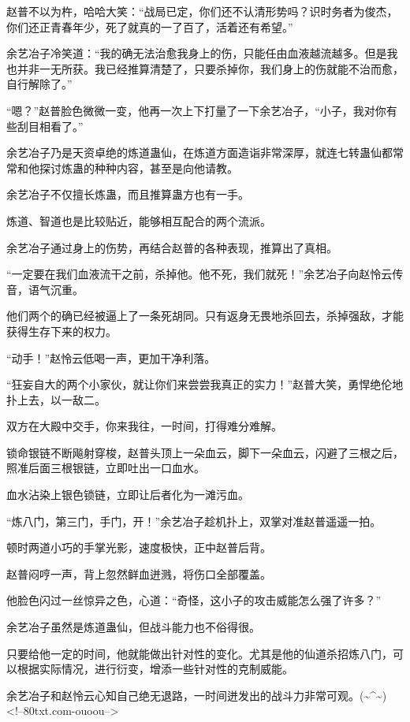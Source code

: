 \begin{this_body}
赵普不以为杵，哈哈大笑：“战局已定，你们还不认清形势吗？识时务者为俊杰，你们还正青春年少，死了就真的一了百了，活着还有希望。”

余艺冶子冷笑道：“我的确无法治愈我身上的伤，只能任由血液越流越多。但是我也并非一无所获。我已经推算清楚了，只要杀掉你，我们身上的伤就能不治而愈，自行解除了。”

“嗯？”赵普脸色微微一变，他再一次上下打量了一下余艺冶子，“小子，我对你有些刮目相看了。”

余艺冶子乃是天资卓绝的炼道蛊仙，在炼道方面造诣非常深厚，就连七转蛊仙都常常和他探讨炼蛊的种种内容，甚至是向他请教。

余艺冶子不仅擅长炼蛊，而且推算蛊方也有一手。

炼道、智道也是比较贴近，能够相互配合的两个流派。

余艺冶子通过身上的伤势，再结合赵普的各种表现，推算出了真相。

“一定要在我们血液流干之前，杀掉他。他不死，我们就死！”余艺冶子向赵怜云传音，语气沉重。

他们两个的确已经被逼上了一条死胡同。只有返身无畏地杀回去，杀掉强敌，才能获得生存下来的权力。

“动手！”赵怜云低喝一声，更加干净利落。

“狂妄自大的两个小家伙，就让你们来尝尝我真正的实力！”赵普大笑，勇悍绝伦地扑上去，以一敌二。

双方在大殿中交手，你来我往，一时间，打得难分难解。

锁命银链不断飚射穿梭，赵普头顶上一朵血云，脚下一朵血云，闪避了三根之后，照准后面三根银链，立即吐出一口血水。

血水沾染上银色锁链，立即让后者化为一滩污血。

“炼八门，第三门，手门，开！”余艺冶子趁机扑上，双掌对准赵普遥遥一拍。

顿时两道小巧的手掌光影，速度极快，正中赵普后背。

赵普闷哼一声，背上忽然鲜血迸溅，将伤口全部覆盖。

他脸色闪过一丝惊异之色，心道：“奇怪，这小子的攻击威能怎么强了许多？”

余艺冶子虽然是炼道蛊仙，但战斗能力也不俗得很。

只要给他一定的时间，他就能做出针对性的变化。尤其是他的仙道杀招炼八门，可以根据实际情况，进行衍变，增添一些针对性的克制威能。

余艺冶子和赵怜云心知自己绝无退路，一时间迸发出的战斗力非常可观。(\~{}\^{}\~{})<!--80txt.com-ouoou-->

\end{this_body}

